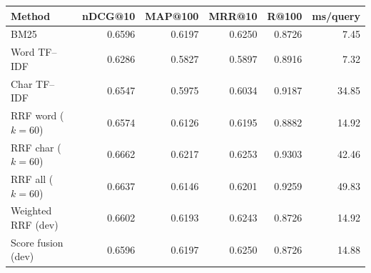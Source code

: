 \begin{tabular}{lrrrrr}
\toprule
Method & nDCG@10 & MAP@100 & MRR@10 & R@100 & ms/query \\
\midrule
BM25 & 0.6596 & 0.6197 & 0.6250 & 0.8726 & 7.45 \\
Word TF--IDF & 0.6286 & 0.5827 & 0.5897 & 0.8916 & 7.32 \\
Char TF--IDF & 0.6547 & 0.5975 & 0.6034 & 0.9187 & 34.85 \\
RRF word ($k=60$) & 0.6574 & 0.6126 & 0.6195 & 0.8882 & 14.92 \\
RRF char ($k=60$) & 0.6662 & 0.6217 & 0.6253 & 0.9303 & 42.46 \\
RRF all ($k=60$) & 0.6637 & 0.6146 & 0.6201 & 0.9259 & 49.83 \\
Weighted RRF (dev) & 0.6602 & 0.6193 & 0.6243 & 0.8726 & 14.92 \\
Score fusion (dev) & 0.6596 & 0.6197 & 0.6250 & 0.8726 & 14.88 \\
\bottomrule
\end{tabular}
